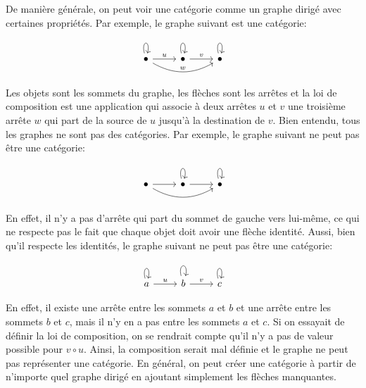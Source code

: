 De manière générale, on peut voir une catégorie comme un graphe dirigé avec
certaines propriétés. Par exemple, le graphe suivant est une catégorie:

\[
\begin{tikzcd}
        \bullet \arrow[loop above] \arrow[r, "u"] \arrow[rr, bend right, "w"]
      & \bullet \arrow[loop above] \arrow[r, "v"]
      & \bullet \arrow[loop above]
\end{tikzcd}
\]

Les objets sont les sommets du graphe, les flèches sont les arrêtes et la loi
de composition est une application qui associe à deux arrêtes $u$ et $v$ une
troisième arrête $w$ qui part de la source de $u$ jusqu'à la destination de
$v$. Bien entendu, tous les graphes ne sont pas des catégories. Par exemple,
le graphe suivant ne peut pas être une catégorie:

\[
\begin{tikzcd}
        \bullet \arrow[r] \arrow[rr, bend right]
      & \bullet \arrow[loop above] \arrow[r]
      & \bullet \arrow[loop above]
\end{tikzcd}
\]

En effet, il n'y a pas d'arrête qui part du sommet de gauche vers lui-même, ce
qui ne respecte pas le fait que chaque objet doit avoir une flèche identité.
Aussi, bien qu'il respecte les identités, le graphe suivant ne peut pas être
une catégorie:

\[
\begin{tikzcd}
        a \arrow[loop above] \arrow[r, "u"]
      & b \arrow[loop above] \arrow[r, "v"]
      & c \arrow[loop above]
\end{tikzcd}
\]

En effet, il existe une arrête entre les sommets $a$ et $b$ et une arrête
entre les sommets $b$ et $c$, mais il n'y en a pas entre les sommets $a$ et
$c$. Si on essayait de définir la loi de composition, on se rendrait compte
qu'il n'y a pas de valeur possible pour $v \circ u$. Ainsi, la composition
serait mal définie et le graphe ne peut pas représenter une catégorie. En
général, on peut créer une catégorie à partir de n'importe quel graphe dirigé
en ajoutant simplement les flèches manquantes.

